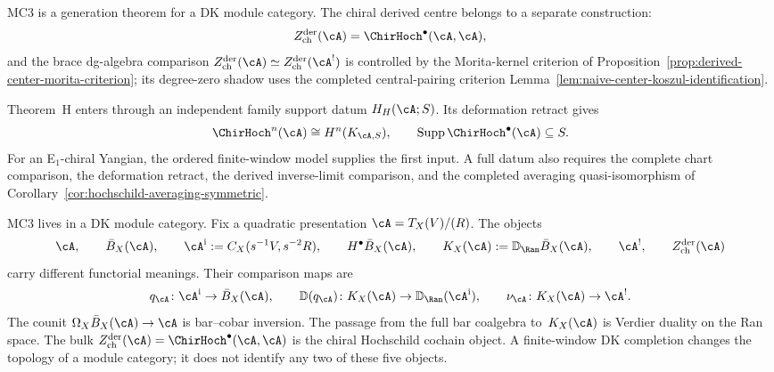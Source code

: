 \begin{remark}
\label{rem:mc3-derived-centre-hochschild-boundary}
%
%
MC3 is a generation theorem for a DK module category. The chiral
derived centre belongs to a separate construction:
\[
 Z^{\mathrm{der}}_{\mathrm{ch}}(\cA)
 =
 \ChirHoch^\bullet(\cA,\cA),
\]
and the brace dg-algebra comparison
$Z^{\mathrm{der}}_{\mathrm{ch}}(\cA)\simeq
Z^{\mathrm{der}}_{\mathrm{ch}}(\cA^!)$ is controlled by the
Morita-kernel criterion of
Proposition~\ref{prop:derived-center-morita-criterion}; its
degree-zero shadow uses the completed central-pairing criterion
Lemma~\ref{lem:naive-center-koszul-identification}.

Theorem~H enters through an independent family support datum
$H_H(\cA;S)$.  Its deformation retract gives
\[
 \ChirHoch^n(\cA)\cong H^n(K_{\cA,S}),
 \qquad
 \operatorname{Supp}\ChirHoch^\bullet(\cA)\subseteq S.
\]
For an E$_1$-chiral Yangian, the ordered finite-window model supplies
the first input. A full datum also requires the complete chart
comparison, the deformation retract, the derived inverse-limit
comparison, and the completed averaging quasi-isomorphism of
Corollary~\ref{cor:hochschild-averaging-symmetric}.
\end{remark}

\begin{remark}
\label{rem:mc3-object-separation}
%
MC3 lives in a DK module category.  Fix a quadratic presentation
$\cA=T_X(V)/(R)$.  The
objects
\[
 \cA,\qquad
 \bar B_X(\cA),\qquad
 \cA^{\mathrm i}:=C_X(s^{-1}V,s^{-2}R),\qquad
 H^\bullet\bar B_X(\cA),\qquad
 K_X(\cA):=\mathbb D_{\Ran}\bar B_X(\cA),\qquad
 \cA^!,\qquad
 Z^{\mathrm{der}}_{\mathrm{ch}}(\cA)
\]
carry different functorial meanings.  Their comparison maps are
\[
q_\cA\colon\cA^{\mathrm i}\to\bar B_X(\cA),\qquad
\mathbb D(q_\cA)\colon K_X(\cA)\to\mathbb D_{\Ran}(\cA^{\mathrm i}),
\qquad
\nu_\cA\colon K_X(\cA)\to\cA^!.
\]
The counit
$\Omega_X\bar B_X(\cA)\to\cA$ is bar--cobar inversion.  The passage
from the full bar coalgebra to~$K_X(\cA)$ is Verdier duality on the Ran
space.  The bulk
$Z^{\mathrm{der}}_{\mathrm{ch}}(\cA)=\ChirHoch^\bullet(\cA,\cA)$ is
the chiral Hochschild cochain object.  A finite-window DK completion
changes the topology of a module category; it does not identify any
two of these five objects.
\end{remark}

